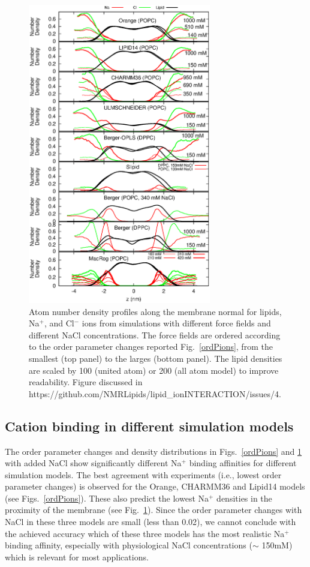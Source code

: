 \documentclass[pre,aps,floatfix,authordate1-4,twocolumn]{revtex4-1}
\begin{document}
\begin{figure}[]
  \centering
  \includegraphics[width=8cm]{../Fig/NAdensities.eps}
  \caption{\label{NAdensities}
    Atom number density profiles along the membrane normal for lipids, Na$^+$, and Cl$^-$ ions 
    from simulations with different force fields and different NaCl concentrations. 
    The force fields are ordered according to the order parameter changes 
    reported Fig.~\ref{ordPions}, from the smallest (top panel) to the larges (bottom panel).
    The lipid densities are scaled by 100 (united atom) or 200 (all atom model) to improve readability. 
    Figure discussed in https://github.com/NMRLipids/lipid\_ionINTERACTION/issues/4.}
\end{figure}



\subsection{Cation binding in different simulation models}
The order parameter changes and density distributions in Figs.~\ref{ordPions} and \ref{NAdensities} 
with added NaCl show significantly different Na$^+$ binding affinities for different simulation models.
The best agreement with experiments (i.e., lowest order parameter changes) is observed for the Orange,
CHARMM36 and Lipid14 models (see Figs.~\ref{ordPions}). These also predict the lowest Na$^+$ densities 
in the proximity of the membrane (see Fig.~\ref{NAdensities}). Since the order parameter changes with NaCl 
in these three models are small (less than 0.02), we cannot conclude with the achieved accuracy which of 
these three models has the most realistic Na$^+$ binding affinity, especially with physiological NaCl concentrations ($\sim$ 150mM) 
which is relevant for most applications. 
\end{document}
